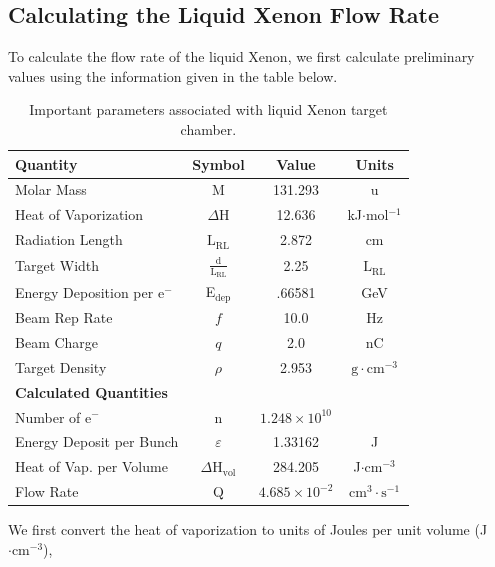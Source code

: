 \documentclass[%
reprint,
amsmath, amssymb,
aps,
floatfix,
]{revtex4-2}
\begin{document}
\subsection{Calculating the Liquid Xenon Flow Rate}
To calculate the flow rate of the liquid Xenon, we first calculate preliminary
values using the information given in the table below.

\begin{table}[H]
    \centering
    \begin{tabular}{lccc}
        \hline \hline
        \textbf{Quantity} & \textbf{Symbol} & \textbf{Value} & \textbf{Units} \\
        \hline
        Molar Mass & \textrm{M} & 131.293 & u \\
        Heat of Vaporization & $\Delta \textrm{H}$ & 12.636 & kJ$\cdot$mol$^{-1}$ \\
        Radiation Length & $\textrm{L}_{\textrm{RL}}$ & 2.872 & cm \\
        Target Width & $\frac{\textrm{d}}{\textrm{L}_{\textrm{RL}}}$ & 2.25 & $\textrm{L}_{\textrm{RL}}$ \\
        Energy Deposition per e$^-$ & E$_{\textrm{dep}}$ & .66581 & GeV \\
        Beam Rep Rate & $f$ & 10.0 & Hz \\
        Beam Charge & $q$ & 2.0 & nC \\
        Target Density & $\rho$ & 2.953 & $\textrm{g} \cdot \textrm{cm}^{-3}$ \\
        \hline \hline
        \textbf{Calculated Quantities} \\
        \hline
        Number of e$^-$ & n & $1.248 \times 10^{10}$ & \\
        Energy Deposit per Bunch & $\varepsilon$ & 1.33162 & J \\
        Heat of Vap. per Volume & $\Delta \textrm{H}_{\textrm{vol}}$ & 284.205 & J$\cdot \textrm{cm}^{-3}$ \\
        Flow Rate & Q & $4.685 \times 10^{-2}$ & cm$^3\cdot \textrm{s}^{-1}$ \\
        \hline \hline
    \end{tabular}
    \caption{\label{tab:XeInfo}Important parameters associated with liquid Xenon target chamber.}
\end{table}
We first convert the heat of vaporization to units of Joules per unit volume (J$\cdot \textrm{cm}^{-3}$),
\end{document}
